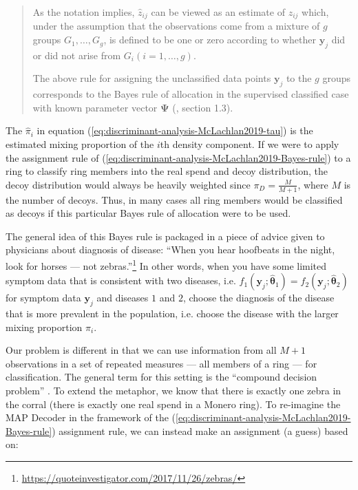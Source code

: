 \documentclass[english]{article}
\begin{document}
\begin{quote}
As the notation implies, $\hat{z}_{ij}$ can be viewed as an estimate
of $z_{ij}$ which, under the assumption that the observations come
from a mixture of $g$ groups $G_{1},\dots,G_{g}$, is defined to
be one or zero according to whether $\boldsymbol{y}_{j}$ did or did
not arise from $G_{i}(i=1,\dots,g)$.

The above rule for assigning the unclassified data points $\boldsymbol{y}_{j}$
to the $g$ groups corresponds to the Bayes rule of allocation in
the supervised classified case with known parameter vector $\boldsymbol{\Psi}$
(\cite{mclachlan1992discriminant}, section 1.3).
\end{quote}
The $\hat{\pi}_{i}$ in equation (\ref{eq:discriminant-analysis-McLachlan2019-tau})
is the estimated mixing proportion of the $i$th density component.
If we were to apply the assignment rule of (\ref{eq:discriminant-analysis-McLachlan2019-Bayes-rule})
to a ring to classify ring members into the real spend and decoy distribution,
the decoy distribution would always be heavily weighted since $\pi_{D}=\tfrac{M}{M+1}$,
where $M$ is the number of decoys. Thus, in many cases all ring members
would be classified as decoys if this particular Bayes rule of allocation
were to be used.

The general idea of this Bayes rule is packaged in a piece of advice
given to physicians about diagnosis of disease: \textquotedblleft When
you hear hoofbeats in the night, look for horses --- not zebras.''\footnote{\href{https://quoteinvestigator.com/2017/11/26/zebras/}{https://quoteinvestigator.com/2017/11/26/zebras/}}
In other words, when you have some limited symptom data that is consistent
with two diseases, i.e. $f_{1}(\boldsymbol{y}_{j};\hat{\boldsymbol{\theta}}_{1})=f_{2}(\boldsymbol{y}_{j};\hat{\boldsymbol{\theta}}_{2})$
for symptom data $\boldsymbol{y}_{j}$ and diseases $1$ and $2$,
choose the diagnosis of the disease that is more prevalent in the
population, i.e. choose the disease with the larger mixing proportion
$\pi_{i}$.

Our problem is different in that we can use information from all $M+1$
observations in a set of repeated measures --- all members of a ring
--- for classification. The general term for this setting is the
``compound decision problem'' \cite{Copas1974}. To extend the metaphor,
we know that there is exactly one zebra in the corral (there is exactly
one real spend in a Monero ring). To re-imagine the MAP Decoder in
the framework of the (\ref{eq:discriminant-analysis-McLachlan2019-Bayes-rule})
assignment rule, we can instead make an assignment (a guess) based
on:
\end{document}
